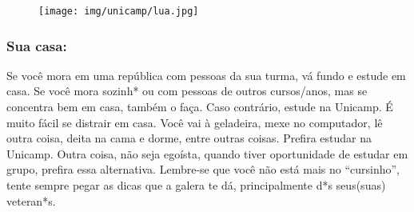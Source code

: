 \begin{figure}[h!]  \centering
  \texttt{[image: img/unicamp/lua.jpg]}
\end{figure}

\subsubsection{Sua casa:} Se você mora em uma república com pessoas da sua
turma, vá fundo e estude em casa. Se você mora sozinh* ou com pessoas de
outros cursos/anos, mas se concentra bem em casa, também o faça. Caso
contrário, estude na Unicamp. É muito fácil se distrair em casa. Você vai à
geladeira, mexe no computador, lê outra coisa, deita na cama e dorme, entre
outras coisas. Prefira estudar na Unicamp. Outra coisa, não seja egoísta,
quando tiver oportunidade de estudar em grupo, prefira essa alternativa.
Lembre-se que você não está mais no ``cursinho'', tente sempre pegar as dicas
que a galera te dá, principalmente d*s seus(suas) veteran*s.
